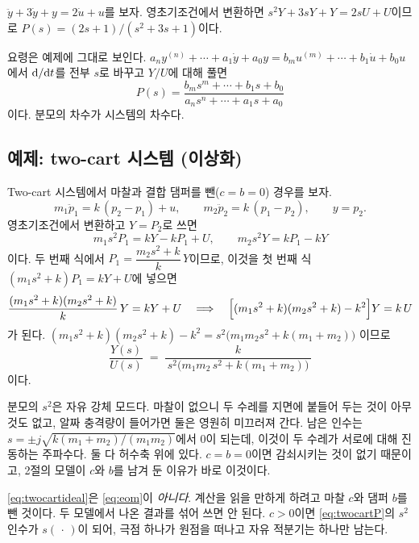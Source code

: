 \documentclass[11pt]{article}
\begin{document}
\begin{example}\label{ex:tf}
$\ddot y + 3\dot y + y = 2\dot u + u$를 보자. 영초기조건에서 변환하면
$s^{2}Y+3sY+Y = 2sU+U$이므로 $P(s) = (2s+1)/(s^{2}+3s+1)$이다.
\end{example}
요령은 예제에 그대로 보인다.
$a_n y^{(n)}+\cdots+a_1\dot y+a_0y = b_m u^{(m)}+\cdots+b_1\dot u+b_0u$에서
$\mathrm{d}/\mathrm{d} t$를 전부 $s$로 바꾸고 $Y/U$에 대해 풀면
\[
   P(s) = \frac{b_ms^{m}+\cdots+b_1s+b_0}{a_ns^{n}+\cdots+a_1s+a_0}
\]
이다. 분모의 차수가 시스템의 차수다.

\subsection{예제: two-cart 시스템 (이상화)}\label{sec:twocarttf}
Two-cart 시스템에서 마찰과 결합 댐퍼를 뺀($c=b=0$) 경우를 보자.
\begin{equation}\label{eq:twocartideal}
   m_1\ddot p_1 = k\,(p_2-p_1) + u,\qquad
   m_2\ddot p_2 = k\,(p_1-p_2),\qquad y=p_2 .
\end{equation}
영초기조건에서 변환하고 $Y=P_2$로 쓰면
\[
   m_1 s^{2}P_1 = kY - kP_1 + U,\qquad
   m_2 s^{2}Y = kP_1 - kY
\]
이다. 두 번째 식에서 $P_1 = \dfrac{m_2s^{2}+k}{k}\,Y$이므로, 이것을 첫 번째 식
$(m_1s^{2}+k)P_1 = kY+U$에 넣으면
\[
   \frac{(m_1s^{2}+k)(m_2s^{2}+k)}{k}\,Y = kY + U
   \quad\Longrightarrow\quad
   \Bigl[(m_1s^{2}+k)(m_2s^{2}+k) - k^{2}\Bigr]Y = k\,U
\]
가 된다. $(m_1s^{2}+k)(m_2s^{2}+k)-k^{2} = s^{2}\bigl(m_1m_2s^{2}+k(m_1+m_2)\bigr)$
이므로
\begin{equation}\label{eq:twocartP}
   \boxed{\;
   \frac{Y(s)}{U(s)} \;=\; \frac{k}{\,s^{2}\bigl(m_1m_2\,s^{2}+k(m_1+m_2)\bigr)\,}\;}
\end{equation}
이다.

\begin{remark}
분모의 $s^{2}$은 자유 강체 모드다. 마찰이 없으니 두 수레를 지면에 붙들어 두는
것이 아무것도 없고, 알짜 충격량이 들어가면 둘은 영원히 미끄러져 간다. 남은 인수는
$s = \pm j\sqrt{k(m_1+m_2)/(m_1m_2)}$에서 0이 되는데, 이것이 두 수레가 서로에
대해 진동하는 주파수다. 둘 다 허수축 위에 있다. $c=b=0$이면 감쇠시키는 것이
없기 때문이고, 2절의 모델이 $c$와 $b$를 남겨 둔 이유가 바로 이것이다.
\end{remark}

\begin{caution}
\eqref{eq:twocartideal}은 \eqref{eq:eom}이 \emph{아니다}. 계산을 읽을 만하게
하려고 마찰 $c$와 댐퍼 $b$를 뺀 것이다. 두 모델에서 나온 결과를 섞어 쓰면 안
된다. $c>0$이면 \eqref{eq:twocartP}의 $s^{2}$ 인수가 $s(\,\cdot\,)$이 되어,
극점 하나가 원점을 떠나고 자유 적분기는 하나만 남는다.
\end{caution}
\end{document}
